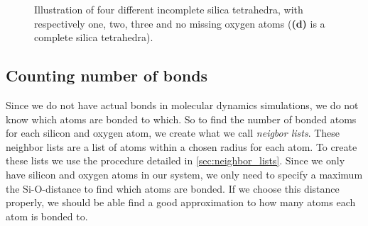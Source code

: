\begin{figure}[htpb]
\begin{subfigure}[c]{1.1\myfigwidth}
        \caption{}%
    \end{subfigure}%
    \caption{%
        Illustration of four different incomplete silica tetrahedra, with respectively one, two, three and no missing oxygen atoms (\textbf{(d)} is a complete silica tetrahedra).%
    }%
    \label{fig:passivation}%
\end{figure}%

\subsection{Counting number of bonds}
Since we do not have actual bonds in molecular dynamics simulations, we do not know which atoms are bonded to which. So to find the number of bonded atoms for each silicon and oxygen atom, we create what we call \emph{neigbor lists}. These neighbor lists are a list of atoms within a chosen radius for each atom. To create these lists we use the procedure detailed in \cref{sec:neighbor_lists}. Since we only have silicon and oxygen atoms in our system, we only need to specify a maximum the Si-O-distance to find which atoms are bonded. If we choose this distance properly, we should be able find a good approximation to how many atoms each atom is bonded to.%



